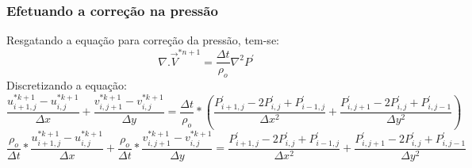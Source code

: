 \documentclass[xcolor=dvipsnames,10pt,aspectratio=169]{beamer}
\begin{document}
	\begin{frame}
		\frametitle{Efetuando a correção na pressão}
		Resgatando a equação para correção da pressão, tem-se:
		\begin{equation}
			\nabla .\vec{V}^{\ast{n + 1}} = \frac{\Delta t}{\rho_o} \nabla^2 P^\prime
		\end{equation}
		Discretizando a equação:
		\begin{equation}
			\frac{u_{i + 1 , j}^{\ast k + 1} - u_{i , j}^{\ast k + 1}}{\Delta x} + \frac{v_{i , j + 1}^{\ast k + 1} - v_{i , j}^{\ast k + 1}}{\Delta y} = \frac{\Delta t}{\rho_o} * \left( \frac{ P^{\prime}_{i + 1, j} - 2 P^{\prime}_{i , j} + P^{\prime}_{i - 1 , j} }{\Delta x^2} + \frac{ P^{\prime}_{i, j + 1} - 2 P^{\prime}_{i , j} + P^{\prime}_{i , j- 1} }{\Delta y^2} \right)
		\end{equation}
		\begin{equation}
		\frac{\rho_o}{ \Delta t} * \frac{u_{i + 1 , j}^{\ast k + 1} - u_{i , j}^{\ast k + 1}}{\Delta x} + \frac{\rho_o}{ \Delta t} * \frac{v_{i , j + 1}^{\ast k + 1} - v_{i , j}^{\ast k + 1}}{\Delta y} =  \frac{ P^{\prime}_{i + 1, j} - 2 P^{\prime}_{i , j} + P^{\prime}_{i - 1 , j} }{\Delta x^2} + \frac{ P^{\prime}_{i, j + 1} - 2 P^{\prime}_{i , j} + P^{\prime}_{i , j- 1} }{\Delta y^2}
		\end{equation}



	\end{frame}
\end{document}

